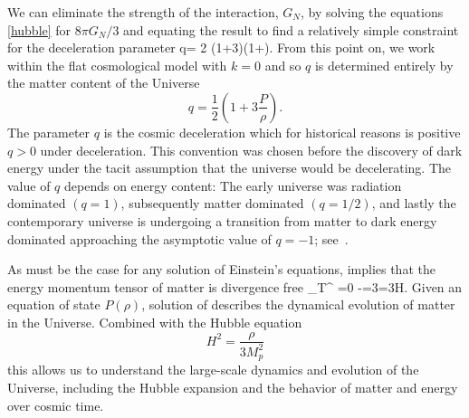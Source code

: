 We can eliminate the strength of the interaction, $G_N$,  by solving the equations \eqref{hubble} for ${8\pi G_N}/{3}$ and equating the result to find a relatively simple constraint for the deceleration parameter
\beqn\label{qparam}
q= 2 \left(1+3\right)\left(1+\right).
\eeqn
 From this point on, we work within the flat cosmological model with $k=0$ and so $q$ is determined entirely by the matter content of the Universe
\begin{equation}\label{qparam}
q=\frac 1 2 \left(1+3\frac{P}{\rho}\right).
\end{equation}
The parameter $q$ is the cosmic deceleration which for historical reasons is positive $q>0$ under deceleration. This convention was chosen before the discovery of dark energy under the tacit assumption that the universe would be decelerating. The value of $q$ depends on energy content: The early universe was radiation dominated $(q = 1)$, subsequently matter dominated $(q = 1/2)$, and lastly the contemporary universe is undergoing a transition from matter to dark energy dominated approaching the asymptotic value of $q = -1$; see~\cite{Rafelski:2013yka}.

As must be the case for any solution of Einstein's equations,  implies that the energy momentum tensor of matter is divergence free
\beqn\label{divTmn}
\nabla_\nu T^{\mu\nu} =0 \Rightarrow -=3=3H.
\eeqn
 Given an equation of state $P(\rho)$, solution of  describes the dynamical evolution of matter in the Universe. Combined with the Hubble equation
\begin{equation}\label{Hubble_eq}
H^2=\frac{\rho}{3M_p^2}
\end{equation}
this allows us to understand the large-scale dynamics and evolution of the Universe, including the Hubble expansion and the behavior of matter and energy over cosmic time.

